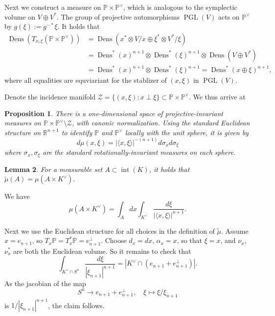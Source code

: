 \documentclass[reqno,10pt]{amsart}
\newcounter{mp}
\newtheorem{Proposition}{Proposition}[section]
\newtheorem{Lemma}[Proposition]{Lemma}
\DeclareMathOperator{\inter}{int}
\DeclareMathOperator{\Dens}{Dens}
\DeclareMathOperator{\PGL}{PGL}
\newcommand{\R}{\mathbb{R}}
\newcommand{\PP}{\mathbb{P}}
\begin{document}
Next we construct a measure on $\mathbb P\times \mathbb P^\vee$, which is analogous to the symplectic volume on $V\oplus V^*$. The group of projective automorphisms $\PGL(V)$ acts on $\PP^\vee$ by $g(\xi):=g^{-*}\xi$. It holds that \begin{align*}
	\Dens(T_{x,\xi}(\PP\times \PP^\vee))&=\Dens(x^*\otimes V/x\oplus \xi^*\otimes V^*/\xi)\\&=\Dens^*(x)^{n+1}\otimes\Dens^*(\xi)^{n+1}\otimes \Dens(V\oplus V^*)\\&=\Dens^*(x)^{n+1}\otimes\Dens^*(\xi)^{n+1}=\Dens^*(x\oplus \xi)^{n+1},
\end{align*}
where all equalities are equviariant for the stablizer of $(x,\xi)$ in $\PGL(V)$.

Denote the incidence manifold $\mathcal Z=\{(x,\xi): x\perp \xi \}\subset \mathbb P\times \mathbb P^\vee$. We thus arrive at
\begin{Proposition}\label{prop:invariant_measure}
	There is a one-dimensional space of projective-invariant measures on $\mathbb P\times \mathbb P^\vee\setminus \mathcal Z$, with canonic normalization. Using the standard Euclidean structure on $\R^{n+1}$ to identify $\PP$ and $\PP^\vee$ locally with the unit sphere, it is given by 
	\[d\mu(x,\xi)= |\langle x,\xi \rangle| ^{-(n+1)}d\sigma_x d\sigma_\xi\]
	where $\sigma_x,\sigma_\xi$ are the standard rotationally-invariant measures on each sphere.
\end{Proposition}

\begin{Lemma}\label{lem:two_measures}
	For a measurable set $A\subset \inter(K)$, it holds that $\widetilde\mu(A)=\mu(A\times K^\vee)$.
\end{Lemma}
\proof
We have $$\mu(A\times K^\vee)=\int_{A}dx\int_{K^\vee}\frac{d\xi}{|\langle x,\xi\rangle|^{n+1}}.$$

Next we use the Euclidean structure for all choices in the definition of $\widetilde\mu$. Assume $x=e_{n+1}$, so $T_x\mathbb P=T_x^*\mathbb P=e_{n+1}^\perp$. Choose $d_x=dx$, $\alpha_x=x$, so that $\xi=x$, and $\nu_x$, $\nu_x^*$ are both the Euclidean volume. So it remains to check that $$\int_{K^\vee\cap S^n}\frac{d\xi}{|\xi_{n+1}|^{n+1}}=|K^\vee\cap (e_{n+1}+e_{n+1}^\perp)|.$$
As the jacobian of the map \begin{equation}\label{eq:projection} S^n\to e_{n+1}+e_{n+1}^\perp,\quad \xi\mapsto \xi/\xi_{n+1}\end{equation} is $1/|\xi_{n+1}|^{n+1}$, the claim follows.
\endproof
\end{document}

